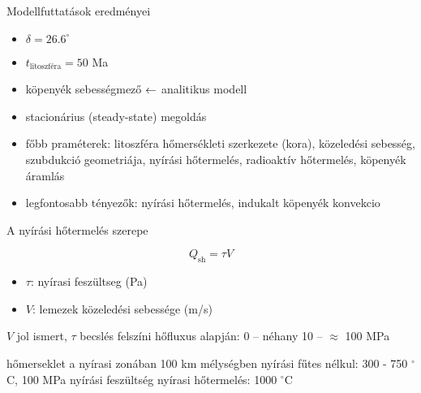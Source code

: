 \documentclass{beamer}
\begin{document}
\begin{frame}{Modellfuttatások eredményei}
    \begin{minipage}[c]{0.45\textwidth}
        \centering
    \end{minipage}
    \hspace{5pt}
    \begin{minipage}[c]{0.45\textwidth}
        \begin{itemize}
            \item $\delta = 26.6^\circ$
            \item $t_{\text{litoszféra}} = 50$ Ma
            \item köpenyék sebességmező $\leftarrow$ analitikus modell
            \item stacionárius (steady-state) megoldás
            \item főbb praméterek: litoszféra hőmersékleti szerkezete (kora), közeledési sebesség, szubdukció geometriája, nyírási hőtermelés, radioaktív hőtermelés, köpenyék áramlás
            \item legfontosabb tényezők: nyírási hőtermelés, indukalt köpenyék konvekcio
        \end{itemize}
    \end{minipage}
\end{frame}


\begin{frame}{A nyírási hőtermelés szerepe}
    \begin{minipage}[c]{0.45\textwidth}
        \centering
    \end{minipage}
    \hspace{5pt}
    \begin{minipage}[c]{0.45\textwidth}
        \[
            Q_{\text{sh}} = \tau V
        \]
        \begin{itemize}
            \item $\tau$: nyírasi feszültseg (Pa)
            \item $V$: lemezek közeledési sebessége (m/s)
        \end{itemize}
        \vspace{10pt}
        
        $V$ jol ismert, $\tau$ becslés felszíni hőfluxus alapján: 0 -- néhany 10 -- $\approx$ 100 MPa
        \vspace{10pt}
        
        hőmerseklet a nyírasi zonában 100 km mélységben nyírási fűtes nélkul: 300 - 750 $^\circ$C, 100 MPa nyírási feszültség nyírasi hőtermelés: 1000 $^\circ$C
    \end{minipage}
\end{frame}
\end{document}
